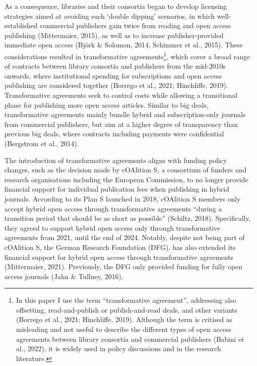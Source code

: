 \documentclass[a4paper,man,floatsintext,longtable,noextraspace,12pt]{apa6}
\begin{document}
As a consequence, libraries and their consortia began to develop
licensing strategies aimed at avoiding such `double dipping' scenarios,
in which well-established commercial publishers gain twice from reading
and open access publishing (Mittermaier, 2015), as well as to increase
publisher-provided immediate open access (Björk \& Solomon, 2014;
Schimmer et al., 2015). These considerations resulted in transformative
agreements\footnote{In this paper I use the term ``transformative
  agreement'', addressing also offsetting, read-and-publish or
  publish-and-read deals, and other variants (Borrego et al., 2021;
  Hinchliffe, 2019). Although the term is critised as misleading and not
  useful to describe the different types of open access agreements
  between library consortia and commercial publishers (Babini et al.,
  2022), it is widely used in policy discussions and in the research
  literature.}, which cover a broad range of contracts between library
consortia and publishers from the mid-2010s onwards, where institutional
spending for subscriptions and open access publishing are considered
together (Borrego et al., 2021; Hinchliffe, 2019). Transformative
agreements seek to control costs while allowing a transitional phase for
publishing more open access articles. Similar to big deals,
transformative agreements mainly bundle hybrid and subscription-only
journals from commercial publishers, but aim at a higher degree of
transparency than previous big deals, where contracts including payments
were confidential (Bergstrom et al., 2014).

The introduction of transformative agreements aligns with funding policy
changes, such as the decision made by cOAlition S, a consortium of
funders and research organisations including the European Commission, to
no longer provide financial support for individual publication fees when
publishing in hybrid journals. According to its Plan S launched in 2018,
cOAlition S members only accept hybrid open access through
transformative agreements ``during a transition period that should be as
short as possible'' (Schiltz, 2018). Specifically, they agreed to
support hybrid open access only through transformative agreements from
2021, until the end of 2024. Notably, despite not being part of
cOAlition S, the German Research Foundation (DFG), has also extended its
financial support for hybrid open access through transformative
agreements (Mittermaier, 2021). Previously, the DFG only provided
funding for fully open access journals (Jahn \& Tullney, 2016).
\end{document}
